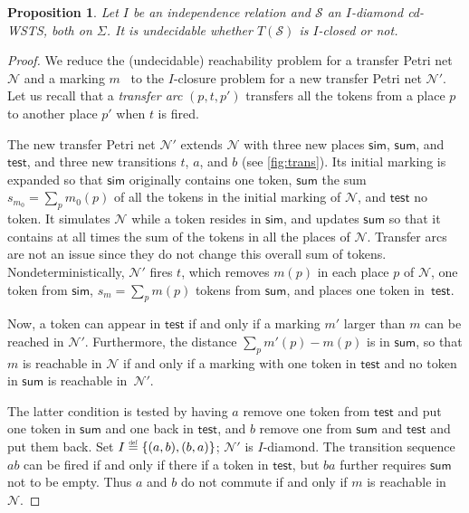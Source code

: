 \documentclass[11pt,reqno,a4paper]{amsart}
\newcommand{\eqdef}{\stackrel{\raisebox{-.15ex}{\scalebox{.5}{\upshape\textrm{def}}}}{=}}
\renewcommand{\cite}{\citep}
\theoremstyle{plain}
\newtheorem{proposition}[theorem]{Proposition}
\theoremstyle{definition}
\theoremstyle{remark}
\begin{document}
\begin{proposition}\label{propcl}Let $I$ be an independence relation and $\mathcal{S}$ an $I$-diamond
  cd-WSTS, both on $\Sigma$.  It is undecidable whether
  $T(\mathcal{S})$ is $I$-closed or not.
\end{proposition}\begin{proof}
  We reduce the (undecidable) reachability problem for a transfer Petri net
  $\mathcal{N}$ and a marking $m$~\cite{rtransnets} to the $I$-closure
  problem for a new transfer Petri net $\mathcal{N}'$.  Let us recall
  that a \emph{transfer arc} $(p,t,p')$ transfers all the tokens from
  a place $p$ to another place $p'$ when $t$ is fired.

  The new transfer Petri net $\mathcal{N}'$ extends $\mathcal{N}$ with
  three new places $\mathsf{sim}$, $\mathsf{sum}$, and $\mathsf{test}$,
  and three new transitions $t$, $a$, and $b$ (see \autoref{fig:trans}).
  Its initial marking is expanded so that $\mathsf{sim}$ originally
  contains one token,  $\mathsf{sum}$ the sum $s_{m_0}=\sum_p m_0(p)$ of
  all the tokens in the initial marking of $\mathcal{N}$, and
  $\mathsf{test}$ no token.  It simulates $\mathcal{N}$ while a token
  resides in $\mathsf{sim}$, and updates $\mathsf{sum}$ so that it
  contains at all times the sum of the tokens in all the places of
  $\mathcal{N}$.
  Transfer arcs are not an issue since they do not change this overall
  sum of tokens.  Nondeterministically, $\mathcal{N}'$ fires $t$, which
  removes $m(p)$ in each place $p$ of $\mathcal{N}$, one token from
  $\mathsf{sim}$, $s_m=\sum_p m(p)$ tokens from $\mathsf{sum}$, and places
  one token in~$\mathsf{test}$.

  Now, a token can appear in $\mathsf{test}$ if and only if a marking
  $m'$ larger than $m$ can be reached in $\mathcal{N}'$.  Furthermore,
  the distance $\sum_p m'(p)-m(p)$ is in $\mathsf{sum}$, so that $m$
  is reachable in $\mathcal{N}$ if and only if a marking with one
  token in $\mathsf{test}$ and no token in $\mathsf{sum}$ is reachable
  in~$\mathcal{N}'$.

  The latter condition is tested by having $a$ remove
  one token from $\mathsf{test}$ and put one token in $\mathsf{sum}$ and
  one back in $\mathsf{test}$, and $b$ remove one from $\mathsf{sum}$
  and $\mathsf{test}$ and put them back.  Set
  $I\eqdef\{(a,b),(b,a)\}$; $\mathcal{N}'$ is $I$-diamond.  The transition
  sequence $ab$ can be fired if and only if there if a token in
  $\mathsf{test}$, but $ba$ further requires $\mathsf{sum}$ not to be
  empty.  Thus $a$ and $b$ do not commute if and only if $m$ is
  reachable in~$\mathcal{N}$.
\end{proof}
\end{document}
